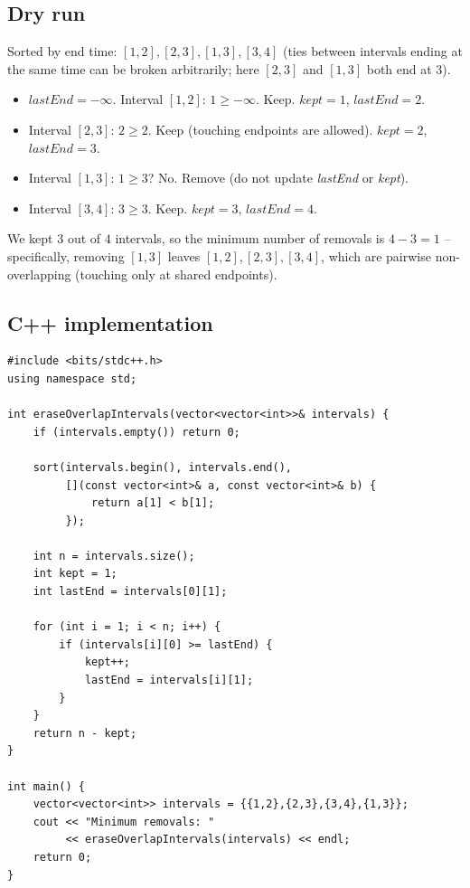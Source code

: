 \subsection*{Dry run}


Sorted by end time: $[1,2],[2,3],[1,3],[3,4]$ (ties between intervals ending
at the same time can be broken arbitrarily; here $[2,3]$ and $[1,3]$ both
end at $3$).

\begin{itemize}
  \item $\textit{lastEnd}=-\infty$. Interval $[1,2]$: $1 \ge -\infty$.
        Keep. $\textit{kept}=1$, $\textit{lastEnd}=2$.
  \item Interval $[2,3]$: $2 \ge 2$. Keep (touching endpoints are allowed).
        $\textit{kept}=2$, $\textit{lastEnd}=3$.
  \item Interval $[1,3]$: $1 \ge 3$? No. Remove (do not update
        \textit{lastEnd} or \textit{kept}).
  \item Interval $[3,4]$: $3 \ge 3$. Keep. $\textit{kept}=3$,
        $\textit{lastEnd}=4$.
\end{itemize}

We kept $3$ out of $4$ intervals, so the minimum number of removals is
$4 - 3 = 1$ -- specifically, removing $[1,3]$ leaves
$[1,2],[2,3],[3,4]$, which are pairwise non-overlapping (touching only at
shared endpoints).

\subsection*{C++ implementation}

\begin{lstlisting}
#include <bits/stdc++.h>
using namespace std;

int eraseOverlapIntervals(vector<vector<int>>& intervals) {
    if (intervals.empty()) return 0;

    sort(intervals.begin(), intervals.end(),
         [](const vector<int>& a, const vector<int>& b) {
             return a[1] < b[1];
         });

    int n = intervals.size();
    int kept = 1;
    int lastEnd = intervals[0][1];

    for (int i = 1; i < n; i++) {
        if (intervals[i][0] >= lastEnd) {
            kept++;
            lastEnd = intervals[i][1];
        }
    }
    return n - kept;
}

int main() {
    vector<vector<int>> intervals = {{1,2},{2,3},{3,4},{1,3}};
    cout << "Minimum removals: "
         << eraseOverlapIntervals(intervals) << endl;
    return 0;
}
\end{lstlisting}

